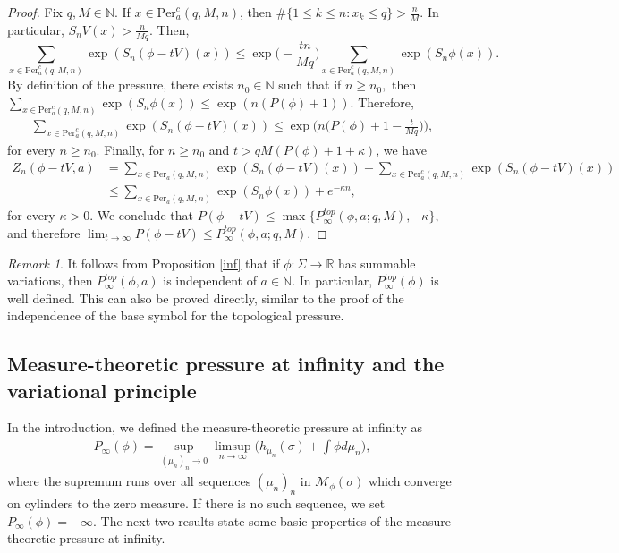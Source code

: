 \documentclass[letterpaper,11pt]{amsart}
\theoremstyle{plain}
\theoremstyle{plain}
\theoremstyle{definition}
\theoremstyle{remark}
\newtheorem{remark}{Remark}[section]
\def\R{{\mathbb R}}
\def\N{{\mathbb N}}
\def\M{{\mathcal M}}
\begin{document}
\begin{proof}
Fix $q,M\in\N$. If $x\in \text{Per}_a^c(q,M,n)$, then $\#\{1\le k\le n:x_k\le q\}> \frac{n}{M}$. In particular, $S_nV(x)> \frac{n}{Mq}.$ Then,
$$\sum_{x\in \text{Per}_a^c(q,M,n)}\exp(S_n(\phi-tV)(x))\le \exp\bigg(-\frac{tn}{Mq}\bigg)\sum_{x\in \text{Per}_a^c(q,M,n)}\exp(S_n\phi(x)).$$
By definition of the pressure, there exists $n_0\in\N$ such that if $n\ge n_0,$ then \\$\sum_{x\in \text{Per}_a^c(q,M,n)}\exp(S_n\phi(x))\le \exp(n(P(\phi)+1)).$ Therefore,
\begin{align*}\sum_{x\in \text{Per}_a^c(q,M,n)}\exp(S_n(\phi-tV)(x))\le \exp\bigg(n\bigg(P(\phi)+1-\frac{t}{Mq}\bigg)\bigg),\end{align*}
for every $n\ge n_0$. Finally, for $n\ge n_0$ and $t>qM(P(\phi)+1+\kappa)$, we have
\begin{align*} Z_n(\phi-tV,a)&=\sum_{x\in \text{Per}_a(q,M,n)}\exp(S_n(\phi-tV)(x))+\sum_{x\in \text{Per}_a^c(q,M,n)}\exp(S_n(\phi-tV)(x))\\
&\le \sum_{x\in \text{Per}_a(q,M,n)}\exp(S_n\phi(x))+e^{-\kappa n},
 \end{align*}
for every $\kappa>0$. We conclude that $P(\phi-tV)\le \max\{P^{top}_\infty(\phi,a;q,M),-\kappa\}$, and therefore  $\lim_{t\to\infty}P(\phi-tV)\le P^{top}_\infty(\phi,a;q,M)$. 
\end{proof}

\begin{remark} It follows from Proposition \ref{inf} that if $\phi:\Sigma\to\R$ has summable variations, then $P^{top}_\infty(\phi,a)$ is independent of $a\in\N$. In particular, $P^{top}_\infty(\phi)$ is well defined. This can also be proved directly, similar to the proof of the independence of the base symbol for the topological pressure.
\end{remark}





\subsection{Measure-theoretic pressure at infinity and the variational principle}\label{sub:var}

In the introduction, we defined the {measure-theoretic pressure at infinity} as
\begin{align*}P_\infty(\phi)=\sup_{(\mu_n)_n\to 0}\limsup_{n\to\infty}\bigg(h_{\mu_n}(\sigma)+\int \phi d\mu_n\bigg),\end{align*}
where the supremum runs over all sequences $(\mu_n)_n$ in $\M_{\phi}(\sigma)$ which converge on cylinders to the zero measure. If there is no such sequence, we set $P_\infty(\phi)=-\infty$. The next two results state some basic properties of the measure-theoretic pressure at infinity.
\end{document}
